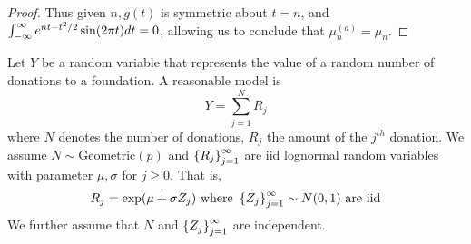 \documentclass{exam}
\begin{document}
\begin{questions}
\begin{parts}
\begin{proof}
        Thus given $n, g(t)$ is symmetric about $t = n$, and $\int_{-\infty}^\infty e^{nt - t^2 / 2}\sin(2\pi t) dt = 0$, allowing us to conclude that $\mu_n^{(a)} = \mu_n$.
    \end{proof}
\end{parts}

\newpage
\question
Let $Y$ be a random variable that represents the value of a random number of donations to a foundation. A reasonable model is
$$Y = \sum_{j = 1}^N R_j$$
where $N$ denotes the number of donations, $R_j$ the amount of the $j^{th}$ donation. We assume $N\sim \text{Geometric}(p)$ and $\left \{ R_j \right \}_{j = 1}^\infty$ are iid lognormal random variables with parameter $\mu, \sigma$ for $j \geq 0$. That is,
$$R_j = \exp (\mu + \sigma Z_j)\text{ where } \left \{ Z_j \right \}_{j = 1}^\infty\sim N(0, 1)\text{ are iid}$$
We further assume that $N$ and $\left \{ Z_j \right \}_{j = 1}^\infty$ are independent.

\end{questions}
\end{document}
